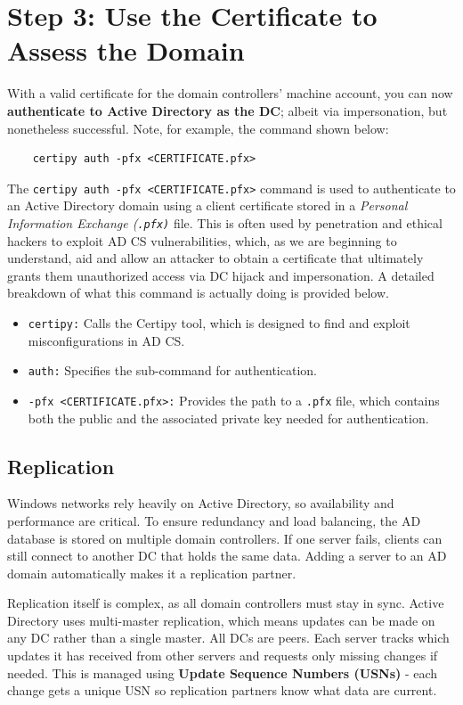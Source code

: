 \section{Step 3: Use the Certificate to Assess the Domain}
With a valid certificate for the domain controllers' machine account, you can now \textbf{authenticate to Active Directory as the DC}; albeit via impersonation, but nonetheless successful. Note, for example, the command shown below:
\begin{notebox}
\begin{verbatim}
    certipy auth -pfx <CERTIFICATE.pfx>
\end{verbatim}
\end{notebox}
The \verb|certipy auth -pfx <CERTIFICATE.pfx>| command is used to authenticate to an Active Directory domain using a client certificate stored in a \textit{Personal Information Exchange (\texttt{.pfx)}} file. This is often used by penetration and ethical hackers to exploit AD CS vulnerabilities, which, as we are beginning to understand, aid and allow an attacker to obtain a certificate that ultimately grants them unauthorized access via DC hijack and impersonation.
A detailed breakdown of what this command is actually doing is provided below.
\begin{itemize}
    \item \texttt{certipy:} Calls the Certipy tool, which is designed to find and exploit misconfigurations in AD CS.
    \item \texttt{auth:} Specifies the sub-command for authentication.
    \item \texttt{-pfx <CERTIFICATE.pfx>:} Provides the path to a \texttt{.pfx} file, which contains both the public and the associated private key needed for authentication.
\end{itemize}
\subsection{Replication}
Windows networks rely heavily on Active Directory, so availability and performance are critical. To ensure redundancy and load balancing, the AD database is stored on multiple domain controllers. If one server fails, clients can still connect to another DC that holds the same data. Adding a server to an AD domain automatically makes it a replication partner.

Replication itself is complex, as all domain controllers must stay in sync. Active Directory uses multi-master replication, which means updates can be made on any DC rather than a single master. All DCs are peers. Each server tracks which updates it has received from other servers and requests only missing changes if needed. This is managed using \textbf{Update Sequence Numbers (USNs)} - each change gets a unique USN so replication partners know what data are current.

